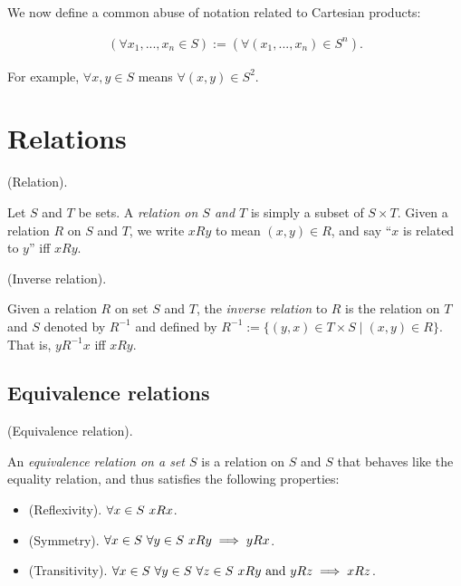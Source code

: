 We now define a common abuse of notation related to Cartesian products:

\begin{align*}
    (\forall x_1, ..., x_n \in S) := (\forall (x_1, ..., x_n) \in S^n).
\end{align*}

For example, $\forall x, y \in S$ means $\forall (x, y) \in S^2$.

\section{Relations}

\begin{defn}
    (Relation).

    Let $S$ and $T$ be sets. A \textit{relation on $S$ and $T$} is simply a subset of $S \times T$. Given a relation $R$ on $S$ and $T$, we write $xRy$ to mean $(x, y) \in R$, and say ``$x$ is related to $y$'' iff $xRy$.
\end{defn}

\begin{defn}
    (Inverse relation).

    Given a relation $R$ on set $S$ and $T$, the \textit{inverse relation} to $R$ is the relation on $T$ and $S$ denoted by $R^{-1}$ and defined by $R^{-1} := \{(y, x) \in T \times S \mid (x, y) \in R\}$. That is, $yR^{-1}x$ iff $xRy$.
\end{defn}

\subsection*{Equivalence relations}

\begin{defn}
    (Equivalence relation).

    An \textit{equivalence relation on a set $S$} is a relation on $S$ and $S$ that behaves like the equality relation, and thus satisfies the following properties:

    \begin{itemize}
        \item (Reflexivity). $\forall x \in S \text{ } xRx$.
        \item (Symmetry). $\forall x \in S \text{ } \forall y \in S \text{ } xRy \implies yRx$.
        \item (Transitivity). $\forall x \in S \text{ } \forall y \in S \text{ } \forall z \in S \text{ } xRy \text{ and } yRz \implies xRz$.
    \end{itemize}
\end{defn}

